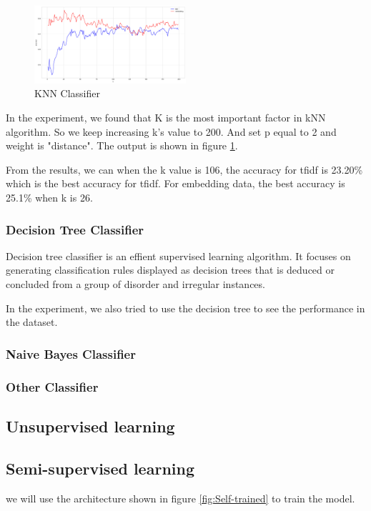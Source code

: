 \documentclass[11pt]{article}
\begin{document}
\begin{figure}[b]
    \centering
    \includegraphics[width=0.5\textwidth]{knn_output.png}
    \caption{KNN Classifier}
    \label{fig:knn}
\end{figure}

In the experiment, we found that K is the most important factor in kNN algorithm. 
So we keep increasing k's value to 200.
And set p equal to 2 and weight is "distance". 
The output is shown in figure \ref{fig:knn}.


From the results, we can when the k value is 106, the accuracy for tfidf is 23.20\% which is the best accuracy for tfidf.
For embedding data, the best accuracy is 25.1\% when k is 26.


\subsubsection{Decision Tree Classifier}

Decision tree classifier is an effient supervised learning algorithm.
It focuses on generating classification rules displayed as decision trees that is deduced or concluded from a group of disorder and irregular instances. \cite{dt_8718711}

In the experiment, we also tried to use the decision tree to see the performance in the dataset.

\subsubsection{Naive Bayes Classifier}


\subsubsection{Other Classifier}


\subsection{Unsupervised learning}


\subsection{Semi-supervised learning}
we will use the architecture shown in figure \ref{fig:Self-trained} to train the model.
\end{document}

